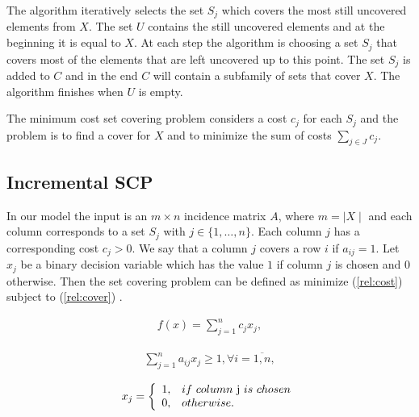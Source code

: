 The algorithm iteratively selects the set $S_{j}$ which covers the most still uncovered elements from $X$. The set $U$ contains the still uncovered elements and at the beginning it is equal to $X$. At each step the algorithm is choosing a set $S_{j}$ that covers most of the elements that are left uncovered up to this point. The set $S_{j}$ is added to $C$ and in the end $C$ will contain a subfamily of sets that cover $X$. The algorithm finishes when $U$ is empty.

The minimum cost set covering problem considers a cost $c_{j}$ for each $S_{j}$ and the problem is to find a cover for $X$ and to minimize the sum of costs $\sum_{j \in J} c_{j}$.

\subsection{Incremental SCP}
\label{sec:proposed}


In our model the input is an $m \times n$ incidence matrix $A$, where $m=\mid X \mid$ and each column corresponds to a set $S_{j}$ with $j \in \{1, \dots , n \}$. Each column $j$ has a corresponding cost $c_j > 0$. We say that a column $j$ covers a row $i$ if $a_{ij}=1$. Let $x_j$ be a binary decision variable which has the value $1$ if column $j$ is chosen and $0$ otherwise. Then the set covering problem can be defined as minimize (\ref{rel:cost}) subject to (\ref{rel:cover}) \cite{Crawford11AHybrid}.

\begin{align}
\label{rel:cost}
f(x)=\sum_{j=1}^{n}{c_{j}x_{j}},
\end{align}

\begin{align}
\label{rel:cover}
\sum_{j=1}^{n}{a_{ij}x_{j}} \geq 1, \forall i=\overline{1,n},
\end{align}

\begin{align}
x_{j} = \left\{
    \begin{array}{ll}
        1, & if~ column~ $j$~ is~ chosen\\
        0, & otherwise.
    \end{array}
\right.
\end{align}

%

